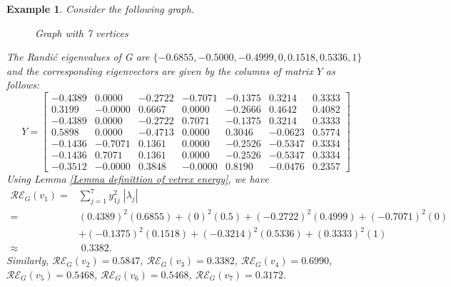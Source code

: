 \documentclass[10 pt]{article}
\newtheorem{example}{Example}[section]
\numberwithin{equation}{section}
\begin{document}
\begin{example}Consider the following graph.
\begin{figure}[H]
  \begin{center}
\caption{Graph with 7 vertices}
\end{center}
\end{figure}

The Randi\'{c} eigenvalues of G are $\{-0.6855, -0.5000, -0.4999, 0, 0.1518, 0.5336, 1\}$ and the corresponding eigenvectors are given by the columns of matrix $Y$ as follows:
\[
Y =
\begin{bmatrix}
-0.4389   & 0.0000 &   -0.2722  & -0.7071  & -0.1375 &   0.3214  &  0.3333\\
    0.3199 &  -0.0000 &   0.6667  &  0.0000 &  -0.2666 &   0.4642 &   0.4082\\
   -0.4389 &   0.0000 &  -0.2722 &   0.7071 &  -0.1375  &  0.3214  &  0.3333\\
    0.5898  &  0.0000 &  -0.4713 &   0.0000 &   0.3046  & -0.0623  &  0.5774\\
   -0.1436  &-0.7071  &  0.1361  &  0.0000  & -0.2526   &-0.5347   & 0.3334\\
   -0.1436  &  0.7071 &   0.1361 &   0.0000 &  -0.2526  & -0.5347  &  0.3334\\
   -0.3512  & -0.0000 &   0.3848 &  -0.0000 &   0.8190  & -0.0476  &  0.2357
\end{bmatrix}
\]
Using Lemma \ref{Lemma definittion of vetrex energy}, we have
\begin{align*}
\mathcal{RE}_{G}(v_1)=& \sum_{j =1}^{7} y_{1j}^2 \; |\lambda_j| \\
  =& (0.4389)^{2}(0.6855) + (0)^{2}(0.5) + (-0.2722)^{2}(0.4999)+ (-0.7071)^{2}(0) \\
  & + (-0.1375)^{2}(0.1518) + (-0.3214)^{2}(0.5336)+ (0.3333)^{2}(1) \\
  \approx &\; 0.3382.
\end{align*}
Similarly, $\mathcal{RE}_{G}(v_2) = 0.5847$, $\mathcal{RE}_{G}(v_3) = 0.3382$, $\mathcal{RE}_{G}(v_4) = 0.6990$, $\mathcal{RE}_{G}(v_5) = 0.5468$, $\mathcal{RE}_{G}(v_6) = 0.5468$, $\mathcal{RE}_{G}(v_7) = 0.3172$.\\
\end{example}
\end{document}
